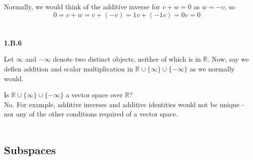 Normally, we would think of the additive inverse for $v + w = 0$ as $w = -v$, so
$$
0 = v + w = v + (-v) = 1v + (-1v) = 0v = 0
$$
\\~\\



\textbf{1.B.6}

Let $\infty$ and $-\infty$ denote two distinct objects, neither of which is in $\mathbb{R}$.
Now, say we defien addition and scalar multiplication in $\mathbb{R}\cup\{\infty\}\cup\{-\infty\}$
as we normally would.

Is $\mathbb{R}\cup\{\infty\}\cup\{-\infty\}$ a vector space over $\mathbb{R}$?
\\

No.
For example, additive inverses and additive identities would not be unique - nor any of the other
conditions required of a vector space.
\\~\\




\subsection{Subspaces}